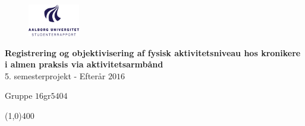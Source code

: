 \clearpage
\thispagestyle{empty}

\begin{figure}[H]
	\raggedleft
		\includegraphics[width=0.2\textwidth]{figures/aaulogo-da.png}
\end{figure} 
\vspace*{\fill} 
\begin{center}	
\begin{Huge}
\textbf{Registrering og objektivisering af fysisk aktivitetsniveau hos kronikere i almen praksis via aktivitetsarmbånd}\\
\vspace{5 mm}
5. semesterprojekt - Efterår $2016$\\
\vspace{3 mm}
\end{Huge}
{\Large Gruppe $16$gr$5404$}
\end{center}
\vspace*{\fill}

\begin{center}
\line(1,0){400}
\end{center}